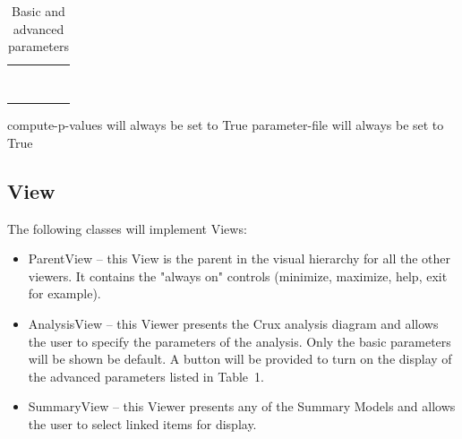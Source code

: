 \documentclass{article}
\begin{document}
\begin{table}[b]
\begin{tabular}{lllll}
                     &                                  &                                 &                                 &                                 \\
                     &                                  &                                 &                                 &                                 \\
                     &                                  &                                 &                                 &                                 \\
                     &                                  &                                 &                                 &                                 \\
                     &                                  &                                 &                                 &                                 \\
                     &                                  &                                 &                                 &                                 \\
                     &                                  &                                 &                                 &                                 \\
                     &                                  &                                 &                                 &                                 \\
\end{tabular}
\caption{Basic and advanced parameters}
\end{table}

compute-p-values will always be set to True
parameter-file will always be set to True
\subsection{View}

The following classes will implement Views:

\begin{itemize}
\item ParentView -- this View is the parent in the visual hierarchy for all the other viewers. 
It contains the "always on" controls (minimize, maximize, help, exit for example).
\item AnalysisView -- this Viewer presents the Crux analysis diagram and
allows the user to specify the parameters of the analysis.
Only the basic parameters will be shown be default. 
A button will be provided to turn on the display of the advanced parameters listed in
Table~1.
\item SummaryView -- this Viewer presents any of the Summary Models
and allows the user to select linked items for display.
\end{itemize}
\end{document}
